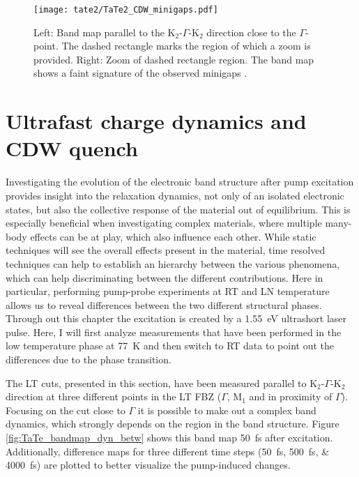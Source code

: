\begin{figure}[h!]
	\centering
	\texttt{[image: tate2/TaTe2\_CDW\_minigaps.pdf]}
	\caption{Left: Band map parallel to the K$_2$-$\Gamma$-K$_2$ direction close to the $\Gamma$-point. The dashed rectangle marks the region of which a zoom is provided. Right: Zoom of dashed rectangle region. The band map shows a faint signature of the observed minigaps \cite{lin_evidence_2022}.}
	\label{fig:TaTe_minigaps}
\end{figure}

\section{Ultrafast charge dynamics and CDW quench}
\label{sec:tate_dynamics}

Investigating the evolution of the electronic band structure after pump excitation provides insight into the relaxation dynamics, not only of an isolated electronic states, but also the collective response of the material out of equilibrium.
This is especially beneficial when investigating complex materials, where multiple many-body effects can be at play, which also influence each other.
While static techniques will see the overall effects present in the material, time resolved techniques can help to establish an hierarchy between the various phenomena, which can help discriminating between the different contributions.
Here in particular, performing pump-probe experiments at RT and LN temperature allows us to reveal differences between the two different structural phases.
Through out this chapter the excitation is created by a \qty{1.55}{\electronvolt} ultrashort laser pulse.
Here, I will first analyze measurements that have been performed in the low temperature phase at \qty{77}{\kelvin} and then switch to RT data to point out the differences due to the phase transition.

The LT cuts, presented in this section, have been measured parallel to K$_2$-$\Gamma$-K$_2$ direction at three different points in the LT FBZ ($\Gamma$, M$_1$ and in proximity of $\Gamma$).
Focusing on the cut close to $\Gamma$ it is possible to make out a complex band dynamics, which strongly depends on the region in the band structure.
Figure \ref{fig:TaTe_bandmap_dyn_betw} shows this band map \qty{50}{\femto\second} after excitation.
Additionally, difference maps for three different time steps (\qtylist{50; 500; 4000}{\femto\second}) are plotted to better visualize the pump-induced changes.

